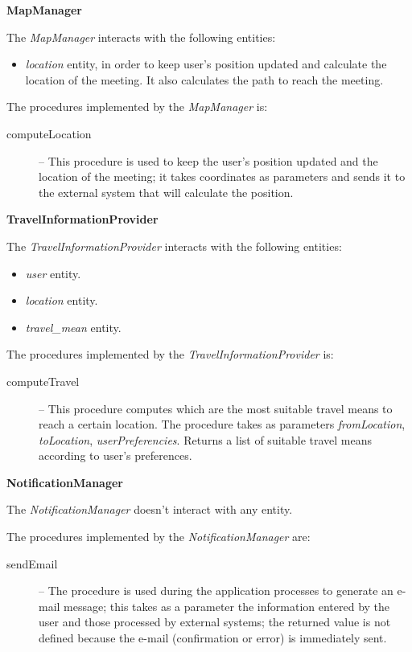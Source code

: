 \documentclass{article}
\begin{document}
	\bigskip
	\noindent
	\textbf{MapManager}

	\bigskip
	\noindent
	The \textit{MapManager} interacts with the following entities:
	\begin{itemize}
	\item \textit{location} entity, in order to keep user’s position updated and calculate the location of the meeting. It also calculates the path to reach the meeting.
	\end{itemize}

	\bigskip
	The procedures implemented by the \textit{MapManager} is:
	\begin{description}
	\item [computeLocation] -- This procedure is used to keep the user's position updated and the location of the meeting; it takes coordinates as parameters and sends it to the external system that will calculate the position.
	\end{description}

	\bigskip
	\noindent
	\textbf{TravelInformationProvider}

	\bigskip
	\noindent
	The \textit{TravelInformationProvider} interacts with the following entities:
	\begin{itemize}
	\item \textit{user} entity.
	\item \textit{location} entity.
	\item \textit{travel\_mean} entity.
	\end{itemize}

	\bigskip
	The procedures implemented by the \textit{TravelInformationProvider} is:
	\begin{description}
	\item [computeTravel] -- This procedure computes which are the most suitable travel means to reach a certain location. The procedure takes as parameters \textit{fromLocation}, \textit{toLocation}, \textit{userPreferencies}. Returns a list of suitable travel means according to user's preferences.
	\end{description}

	\bigskip
	\noindent
	\textbf{NotificationManager}

	\bigskip
	\noindent
	The \textit{NotificationManager} doesn't interact with any entity.

	\bigskip
	The procedures implemented by the \textit{NotificationManager} are:
	\begin{description}
	\item [sendEmail] -- The procedure is used during the application processes to generate an e-mail message; this takes as a parameter the information entered by the user and those processed by external systems; the returned value is not defined because the e-mail (confirmation or error) is immediately sent.
	\end{description}
\end{document}
